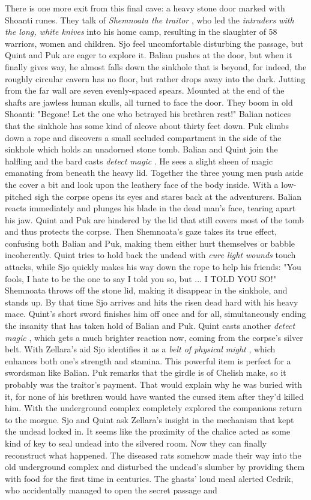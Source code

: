 There is one more exit from this final cave: a heavy stone door marked with Shoanti runes. They talk of {\itshape Shemnoata the traitor} , who led the  {\itshape intruders with the long, white knives} into his home camp, resulting in the slaughter of 58 warriors, women and children. Sjo feel uncomfortable disturbing the passage, but Quint and Puk are eager to explore it. Balian pushes at the door, but when it finally gives way, he almost falls down the sinkhole that is beyond, for indeed, the roughly circular cavern has no floor, but rather drops away into the dark. Jutting from the far wall are seven evenly-spaced spears. Mounted at the end of the shafts are jawless human skulls, all turned to face the door. They boom in old Shoanti: "Begone! Let the one who betrayed his brethren rest!" Balian notices that the sinkhole has some kind of alcove about thirty feet down. Puk climbs down a rope and discovers a small secluded compartment in the side of the sinkhole which holds an unadorned stone tomb. Balian and Quint join the halfling and the bard casts {\itshape detect magic} . He sees a slight sheen of magic emanating from beneath the heavy lid. Together the three young men push aside the cover a bit and look upon the leathery face of the body inside. With a low-pitched sigh the corpse opens its eyes and stares back at the adventurers. Balian reacts immediately and plunges his blade in the dead man's face, tearing apart his jaw. Quint and Puk are hindered by the lid that still covers most of the tomb and thus protects the corpse. Then Shemnoata's gaze takes its true effect, confusing both Balian and Puk, making them either hurt themselves or babble incoherently. Quint tries to hold back the undead with  {\itshape cure light wounds} touch attacks, while Sjo quickly makes his way down the rope to help his friends: "You fools, I hate to be the one to say I told you so, but ... I TOLD YOU SO!" Shemnoata throws off the stone lid, making it disappear in the sinkhole, and stands up. By that time Sjo arrives and hits the risen dead hard with his heavy mace. Quint's short sword finishes him off once and for all, simultaneously ending the insanity that has taken hold of Balian and Puk. Quint casts another {\itshape detect magic} , which gets a much brighter reaction now, coming from the corpse's silver belt. With Zellara's aid Sjo identifies it as a  {\itshape belt of physical might} , which enhances both one's strength and stamina. This powerful item is perfect for a swordsman like Balian. Puk remarks that the girdle is of Chelish make, so it probably was the traitor's payment. That would explain why he was buried with it, for none of his brethren would have wanted the cursed item after they'd killed him. With the underground complex completely explored the companions return to the morgue. Sjo and Quint ask Zellara's insight in the mechanism that kept the undead locked in. It seems like the proximity of the chalice acted as some kind of key to seal undead into the silvered room. Now they can finally reconstruct what happened. The diseased rats somehow made their way into the old underground complex and disturbed the undead's slumber by providing them with food for the first time in centuries. The ghasts' loud meal alerted Cedrik, who accidentally managed to open the secret passage and 